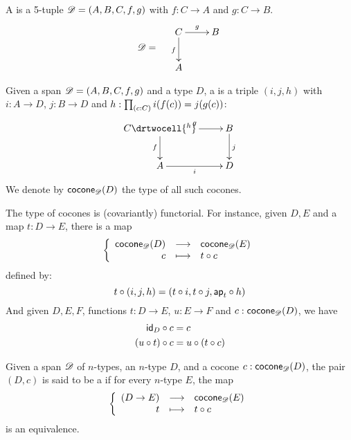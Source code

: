 \begin{defn}
  A  %
  is a 5-tuple $\mathscr{D}=(A,B,C,f,g)$ with %
  $f:C\to{}A$ and $g:C\to{}B$.
  \[\Ddiag=\quad\vcenter{\xymatrix{C \ar^g[r] \ar_f[d] & B \\ A & }}\]
\end{defn}

\begin{defn}
  Given a span $\mathscr{D}=(A,B,C,f,g)$ and a type $D$, a %
   is a triple $(i, j, h)$
  with $i:A\to{}D$, $j:B\to{}D$ and $h : \prd{c:C}i(f(c))=j(g(c))$:
  \[\uppercurveobject{{ }}\lowercurveobject{{ }}\twocellhead{{ }}
  \xymatrix{C \ar^g[r] \ar_f[d] \drtwocell{^h} & B \ar^j[d] \\ A \ar_i[r] & D
  }\]
  We denote by $\mathsf{cocone}_{\mathscr{D}}(D)$ the type of all such cocones.
\end{defn}

The type of cocones is (covariantly) functorial.
For instance, given $D,E$ %
and a map $t:D\to{}E$, there is a map
  \[\left\{\begin{array}{rcl}\mathsf{cocone}_{\mathscr{D}}(D) & \longrightarrow & \mathsf{cocone}_{\mathscr{D}}(E) \\ c & \longmapsto & t\circ c \end{array}\right.\]
  defined by:
  \[t\circ(i,j,h)=(t\circ{}i,t\circ{}j,\mathsf{ap}_{t}\circ{}h)\]
And given $D,E,F$, %
functions $t:D\to{}E$, $u:E\to{}F$ and $c:\mathsf{cocone}_{\mathscr{D}}(D)$, we have
\begin{align}
  \composecocone{\idfunc[D]}c &= c \label{eq:composeconeid}\\
  \composecocone{(u\circ{}t)}c&=\composecocone{u}(\composecocone{t}c)\label{eq:composeconefunc}
\end{align}

\begin{defn}
  Given a span $\mathscr{D}$ of $n$-types, an $n$-type $D$, and a cocone
  $c:\mathsf{cocone}_{\mathscr{D}}(D)$, the pair $(D,c)$ is said to be a 
  if for every $n$-type $E$, the map
  \[\left\{\begin{array}{rcl}(D\to{}E) & \longrightarrow & \mathsf{cocone}_{\mathscr{D}}(E) \\ t & \longmapsto & t\circ c \end{array}\right.\]
  is an equivalence.
\end{defn}

